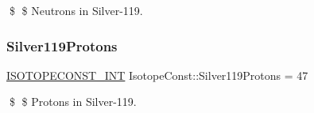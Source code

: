 \$ \$ Neutrons in Silver-\/119. \mbox{\label{group___isotope_const-_silver-_ag119_ga009f6a40aed2d0585e9894813826cd05}} 
\subsubsection{\texorpdfstring{Silver119\+Protons}{Silver119Protons}}
{\footnotesize\ttfamily \mbox{\hyperlink{group___isotope_const-_macros_ga5f18360b3e99483a35c32d789e62621c}{I\+S\+O\+T\+O\+P\+E\+C\+O\+N\+S\+T\+\_\+\+I\+NT}} Isotope\+Const\+::\+Silver119\+Protons = 47}

\$ \$ Protons in Silver-\/119. 